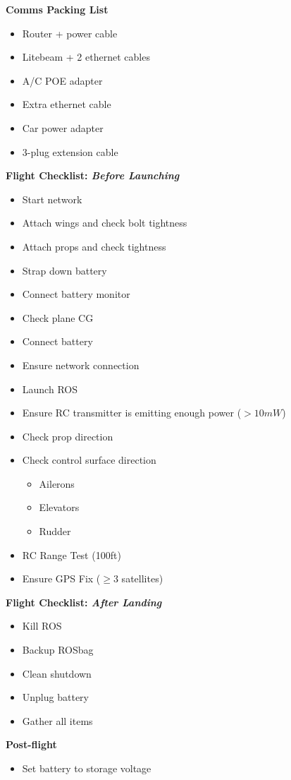 \documentclass[]{auvsi_doc}
\begin{document}
\hrulefill

\textbf{Comms Packing List}
\begin{itemize}
	\item Router + power cable
	\item Litebeam + 2 ethernet cables
	\item A/C POE adapter
	\item Extra ethernet cable
	\item Car power adapter
	\item 3-plug extension cable
\end{itemize}

\hrulefill

\textbf{Flight Checklist: \textit{Before Launching}}
\begin{itemize}
	\item Start network
	\item Attach wings and check bolt tightness
	\item Attach props and check tightness
	\item Strap down battery
	\item Connect battery monitor
	\item Check plane CG
	\item Connect battery
	\item Ensure network connection
	\item Launch ROS
	\item Ensure RC transmitter is emitting enough power ($>10mW$)
	\item Check prop direction
	\item Check control surface direction
	\begin{itemize}
		\item Ailerons
		\item Elevators
		\item Rudder
	\end{itemize}
	\item RC Range Test (100ft)
	\item Ensure GPS Fix ($\geq 3$ satellites)
\end{itemize}

\hrulefill

\textbf{Flight Checklist: \textit{After Landing}}
\begin{itemize}
	\item Kill ROS
	\item Backup ROSbag
	\item Clean shutdown
	\item Unplug battery
	\item Gather all items
\end{itemize}

\hrulefill

\textbf{Post-flight}
\begin{itemize}
	\item Set battery to storage voltage
\end{itemize}
\end{document}
